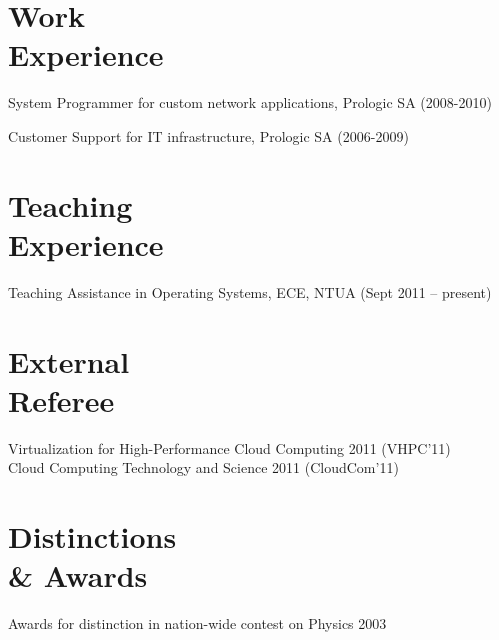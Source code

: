 \documentclass[margin,centered]{res}
\newenvironment{list1}{
  \begin{list}{\ding{71}}{%
      \setlength{\itemsep}{0in}
      \setlength{\parsep}{0in} \setlength{\parskip}{0in}
      \setlength{\topsep}{0in} \setlength{\partopsep}{0in}
      \setlength{\leftmargin}{0.17in}}}{\end{list}}
\begin{document}
\begin{resume}
\section{\sc Work\\Experience}
\begin{list1}
\item
System Programmer for custom network applications, Prologic SA (2008-2010)
\item
Customer Support for IT infrastructure, Prologic SA (2006-2009)
\end{list1}

\section{\sc Teaching\\Experience}
Teaching Assistance in Operating Systems, ECE, NTUA (Sept 2011 – present)

\section{\sc External\\Referee}
Virtualization for High-Performance Cloud Computing 2011 (VHPC'11)\\
Cloud Computing Technology and Science 2011 (CloudCom'11)


\section{\sc Distinctions\\\& Awards}
Awards for distinction in nation-wide contest on Physics 2003

\end{resume}
\end{document}
